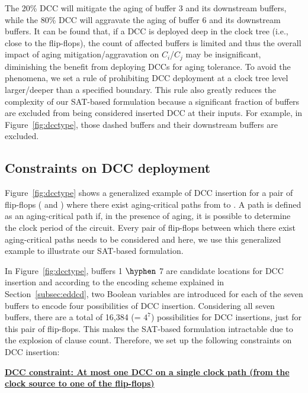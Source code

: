 The 20\% DCC will mitigate the aging of buffer 3 and its downstream buffers, while the 80\% DCC will aggravate the aging of buffer 6 and its downstream buffers. It can be found that, if a DCC is deployed deep in the clock tree (i.e., close to the flip-flops), the count of affected buffers is limited and thus the overall impact of aging mitigation/aggravation on $C_i$/$C_j$ may be insignificant, diminishing the benefit from deploying DCCs for aging tolerance.  To avoid the phenomena, we set a rule of prohibiting DCC deployment at a clock tree level larger/deeper than a specified boundary. This rule also greatly reduces the complexity of our SAT-based formulation because a significant fraction of buffers are excluded from being considered inserted DCC at their inputs. For example, in Figure~\ref{fig:dcctype}, those dashed buffers and their downstream buffers are excluded. 

\subsection{Constraints on DCC deployment}
\label{subsec:dccccc}

Figure~\ref{fig:dcctype} shows a generalized example of DCC insertion for a pair of flip-flops ( and ) where there exist aging-critical paths from  to . A path is defined as an aging-critical path if, in the presence of aging, it is possible to determine the clock period of the circuit. Every pair of flip-flops between which there exist aging-critical paths needs to be considered and here, we use this generalized example to illustrate our SAT-based formulation.

In Figure~\ref{fig:dcctype}, buffers 1 $\hyphen$ 7 are candidate locations for DCC insertion and according to the encoding scheme explained in Section~\ref{subsec:eddcd}, two Boolean variables are introduced for each of the seven buffers to encode four possibilities of DCC insertion. Considering all seven buffers, there are a total of 16,384 (= $4^7$) possibilities for DCC insertions, just for this pair of flip-flops. This makes the SAT-based formulation intractable due to the explosion of clause count. Therefore, we set up the following constraints on DCC insertion: 

{\noindent \textbf{\uline{DCC constraint: At most one DCC on a single clock path (from the clock source to one of the flip-flops)}}}

